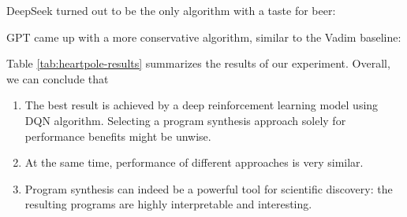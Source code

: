 DeepSeek turned out to be the only algorithm with a taste for beer:



GPT came up with a more conservative algorithm, similar to the Vadim baseline:



\begin{table}[]
    \centering
    
    \caption{Summary of HeartPole agents: which actions they used and final scores}
    \label{tab:heartpole-results}
\end{table}


Table \ref{tab:heartpole-results} summarizes the results of our experiment. Overall, we can conclude that

\begin{enumerate}
    \item The best result is achieved by a deep reinforcement learning model using DQN algorithm.
    Selecting a program synthesis approach solely for performance benefits might be unwise.
    \item At the same time, performance of different approaches is very similar.
    \item Program synthesis can indeed be a powerful tool for scientific discovery: the resulting programs are highly interpretable and interesting.
\end{enumerate}



